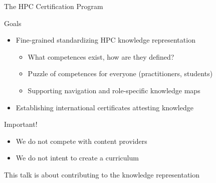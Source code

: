 \documentclass[compress,aspectratio=169]{beamer}
\begin{document}
\begin{frame}{The HPC Certification Program}
		\begin{block}{Goals}
			\begin{itemize}
				\item Fine-grained standardizing HPC knowledge representation
          \begin{itemize}
            \item What competences exist, how are they defined?
            \item Puzzle of competences for everyone (practitioners, students)
            \item Supporting navigation and role-specific knowledge maps
          \end{itemize}
				\item Establishing international certificates attesting knowledge
			\end{itemize}
		\end{block}

		\begin{block}{Important!}
			\begin{itemize}
				\item We do not compete with content providers
				\item We do not intent to create a curriculum
			\end{itemize}
		\end{block}

    \begin{block}{This talk is about contributing to the knowledge representation}
    \end{block}
\end{frame}
\end{document}
